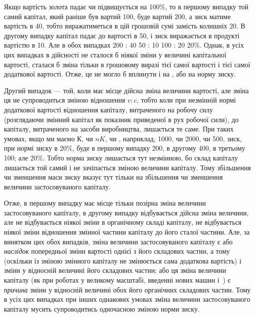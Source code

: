 \parcont{}  %
Якщо вартість золота падає чи підвищується
на 100\%, то
в першому випадку той самий капітал, який раніше був вартий
100, буде вартий 200, а зиск
матиме вартість в 40, тобто виражатиметься
в цій грошовій сумі замість колишніх 20.
В другому випадку капітал падає до вартості в 50, і зиск виражається в продукті вартістю в 10. Але в обох випадках 200 : 40 \deq{} 50 : 10 \deq{} 100 : 20 \deq{} 20\%.
Однак, в усіх цих випадках в дійсності не сталося б ніякої
зміни у величині капітальної вартості, сталася б зміна тільки
в грошовому виразі тієї самої вартості і тієї самої додаткової
вартості. Отже, це не могло б вплинути і на , або на норму
зиску.

Другий випадок — той, коли має місце дійсна зміна величини
вартості, але зміна ця не супроводиться зміною відношення
$v : c$, тобто коли при незмінній нормі додаткової вартості відношення
капіталу, витраченого на робочу силу (розглядаючи
змінний капітал як показник приведеної в рух робочої сили), до
капіталу, витраченого на засоби виробництва, лишається те
саме. При таких умовах, якщо ми маємо $К$, чи $nK$, чи , наприклад,
1000, чи 2000, чи 500, зиск, при нормі зиску в 20\%,
буде в першому випадку \deq{} 200, в другому \deq{} 400, в третьому \deq{} 100;
але  \deq{}  \deq{}  \deq{} 20\%. Тобто норма зиску лишається тут
незмінною, бо склад капіталу лишається той самий і не зачіпається
зміною величини капіталу. Тому збільшення чи зменшення
маси зиску вказує тут тільки на збільшення чи зменшення
величини застосовуваного капіталу.

Отже, в першому випадку має місце тільки позірна зміна
величини застосовуваного капіталу, в другому випадку відбувається
дійсна зміна величини, але не відбувається ніякої зміни
в органічному складі капіталу, не відбувається ніякої зміни
відношення змінної частини капіталу до його сталої частини.
Але, за винятком цих обох випадків, зміна величини застосовуваного
капіталу є або \emph{наслідок} попередньої зміни вартості
однієї з його складових частин, а тому (оскільки із зміною змінного
капіталу не змінюється сама додаткова вартість) і зміни
у відносній величині його складових частин; або ця зміна величини
капіталу (як при роботах у великому масштабі, введенні нових
машин і~) є \emph{причина} зміни у відносній величині обох його
органічних складових частин. Тому в усіх цих випадках при
інших однакових умовах зміна величини застосовуваного капіталу
мусить супроводитись одночасною зміною норми зиску.
